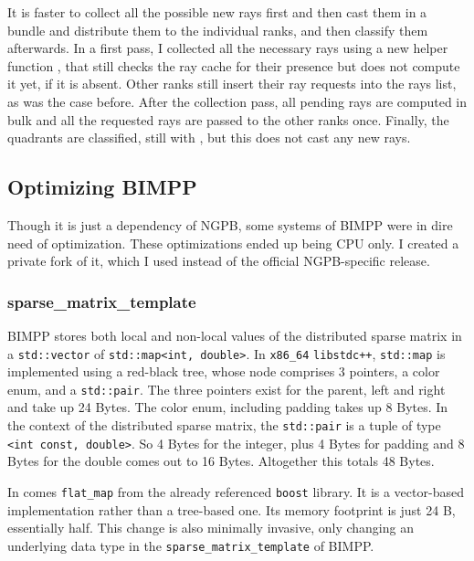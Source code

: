 It is faster to collect all the possible new rays first and then cast them in a bundle and distribute them to the individual ranks, and then classify them afterwards.
In a first pass, I collected all the necessary rays using a new helper function , that still checks the ray cache for their presence but does not compute it yet, if it is absent.
Other ranks still insert their ray requests into the rays list, as was the case before.
After the collection pass, all pending rays are computed in bulk and all the requested rays are passed to the other ranks once.
Finally, the quadrants are classified, still with , but this does not cast any new rays.

\subsection{Optimizing BIMPP}
\label{sec:implementation-host-side-bimpp}

Though it is just a dependency of NGPB, some systems of BIMPP were in dire need of optimization.
These optimizations ended up being CPU only.
I created a private fork of it, which I used instead of the official NGPB-specific release.

\subsubsection{sparse\_matrix\_template}
\label{sec:implementation-host-side-bimpp-sparse-matrix-template}

BIMPP stores both local and non-local values of the distributed sparse matrix in a \texttt{std::vector} of \texttt{std::map<int, double>}.
In \texttt{x86\_64} \texttt{libstdc++}, \texttt{std::map} is implemented using a red-black tree, whose node comprises 3 pointers, a color enum, and a \texttt{std::pair}.
The three pointers exist for the parent, left and right and take up 24 Bytes.
The color enum, including padding takes up 8 Bytes.
In the context of the distributed sparse matrix, the \texttt{std::pair} is a tuple of type \texttt{<int const, double>}.
So 4 Bytes for the integer, plus 4 Bytes for padding and 8 Bytes for the double comes out to 16 Bytes.
Altogether this totals 48 Bytes.

In comes \texttt{flat\_map} from the already referenced \texttt{boost} library.
It is a vector-based implementation rather than a tree-based one.
Its memory footprint is just 24 B, essentially half.
This change is also minimally invasive, only changing an underlying data type in the \texttt{sparse\_matrix\_template} of BIMPP.

